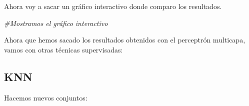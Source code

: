 \documentclass[]{article}
\newenvironment{Shaded}{\begin{snugshade}}{\end{snugshade}}
\newcommand{\KeywordTok}[1]{\textcolor[rgb]{0.13,0.29,0.53}{\textbf{#1}}}
\newcommand{\DataTypeTok}[1]{\textcolor[rgb]{0.13,0.29,0.53}{#1}}
\newcommand{\DecValTok}[1]{\textcolor[rgb]{0.00,0.00,0.81}{#1}}
\newcommand{\StringTok}[1]{\textcolor[rgb]{0.31,0.60,0.02}{#1}}
\newcommand{\CommentTok}[1]{\textcolor[rgb]{0.56,0.35,0.01}{\textit{#1}}}
\newcommand{\OperatorTok}[1]{\textcolor[rgb]{0.81,0.36,0.00}{\textbf{#1}}}
\newcommand{\NormalTok}[1]{#1}
\begin{document}
Ahora voy a sacar un gráfico interactivo donde comparo los resultados.

\begin{Shaded}
\end{Shaded}

\hypertarget{htmlwidget-a81357ce590ddd8ee8c2}{}

\begin{Shaded}
\begin{Highlighting}[]
\CommentTok{#Mostramos el gráfico interactivo}
\end{Highlighting}
\end{Shaded}

Ahora que hemos sacado los resultados obtenidos con el perceptrón
multicapa, vamos con otras técnicas supervisadas:

\subsection{KNN}\label{knn}

Hacemos nuevos conjuntos:
\end{document}
